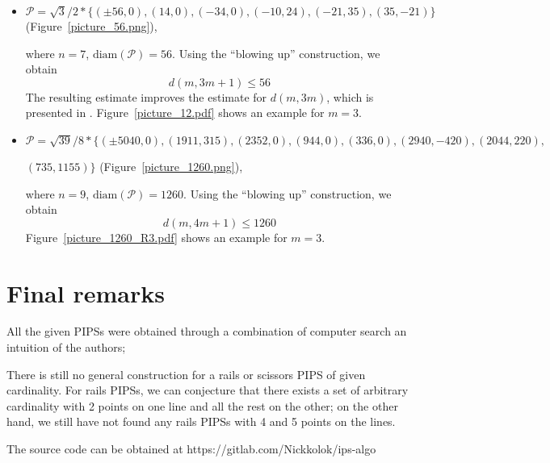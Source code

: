 \documentclass[12pt]{article}
\theoremstyle{theorem}
\theoremstyle{dfn}
\theoremstyle{remark}
\begin{document}
\begin{itemize}
\setlength{\itemsep}{-1mm}


\item
$\mathcal{P}=\sqrt{3}/{2} * \{ (\pm 56, 0),
(14, 0),
(-34, 0),
(-10, 24),
(-21 , 35),
(35, -21)\}
$
(Figure~\ref{picture_56.png}),

where $n = 7$, $\operatorname{diam(\mathcal{P})} = 56$. Using the ``blowing up''
construction, we obtain
\begin{equation}\label{result2}
d(m, 3m + 1) \leq 56
\end{equation}
The resulting estimate improves the estimate for $d(m, 3m)$, which is presented
in \cite{kemnitz1988punktmengen}. Figure~\ref{picture_12.pdf} shows an example
for $m = 3$.


\item
$\mathcal{P}=\sqrt{39}/{8} * \{ (\pm 5040, 0),
(1911, 315),
(2352, 0),
(944, 0),
(336, 0),
(2940, -420),
(2044, 220),
$

$
(735, 1155)\}
$
(Figure~\ref{picture_1260.png}),

where $n = 9$, $\operatorname{diam(\mathcal{P})} = 1260$. Using the ``blowing up''
construction, we obtain
\begin{equation}\label{result3}
d(m, 4m + 1) \leq 1260
\end{equation}
Figure~\ref{picture_1260_R3.pdf} shows an example for $m = 3$.

\end{itemize}

\section{Final remarks}
All the given PIPSs were obtained through a combination of computer search an intuition of the authors;

There is still no general construction for a rails or scissors PIPS of given cardinality.
For rails PIPSs, we can conjecture that there exists a set of arbitrary cardinality with 2 points on one line
and all the rest on the other;
on the other hand, we still have not found any rails PIPSs with 4 and 5 points on the lines.


The source code can be obtained at https://gitlab.com/Nickkolok/ips-algo

\printbibliography
%
\end{document}
